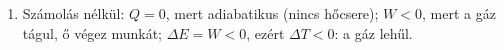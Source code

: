 \documentclass[11pt,a4paper]{article}
\begin{document}
\begin{enumerate}
  \textbf{Nem változik:} az egyes pontok állapotjelzői ($p$, $V$, $T$), a szakaszonkénti
  mennyiségek nagysága, a bezárt terület nagysága és $\Delta E_\text{össz} = 0$.

\item Számolás nélkül:
  $Q = 0$, mert adiabatikus (nincs hőcsere);
  $W < 0$, mert a gáz tágul, ő végez munkát;
  $\Delta E = W < 0$, ezért $\Delta T < 0$: a gáz lehűl.
\end{enumerate}
\end{document}
